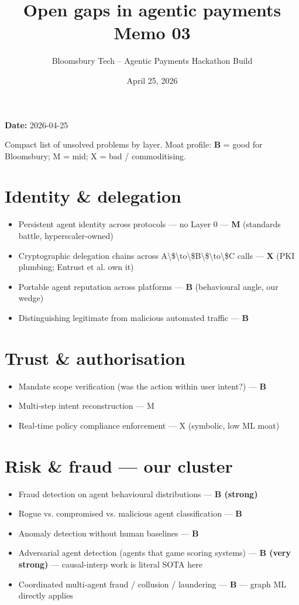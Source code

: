 \documentclass[11pt]{article}
\title{\textbf{Open gaps in agentic payments}\\
\large Memo 03}
\author{Bloomsbury Tech -- Agentic Payments Hackathon Build}
\date{April 25, 2026}
\begin{document}
\maketitle

\textbf{Date:} 2026-04-25

Compact list of unsolved problems by layer. Moat profile: \textbf{B} = good for Bloomsbury; M = mid; X = bad / commoditising.

\section{Identity \& delegation}
\begin{itemize}
  \item Persistent agent identity across protocols --- no Layer 0 --- \textbf{M} (standards battle, hyperscaler-owned)
  \item Cryptographic delegation chains across A\textbackslash{}\$\textbackslash{}to\textbackslash{}\$B\textbackslash{}\$\textbackslash{}to\textbackslash{}\$C calls --- \textbf{X} (PKI plumbing; Entrust et al. own it)
  \item Portable agent reputation across platforms --- \textbf{B} (behavioural angle, our wedge)
  \item Distinguishing legitimate from malicious automated traffic --- \textbf{B}
\end{itemize}
\section{Trust \& authorisation}
\begin{itemize}
  \item Mandate scope verification (was the action within user intent?) --- \textbf{B}
  \item Multi-step intent reconstruction --- M
  \item Real-time policy compliance enforcement --- X (symbolic, low ML moat)
\end{itemize}
\section{Risk \& fraud --- our cluster}
\begin{itemize}
  \item Fraud detection on agent behavioural distributions --- \textbf{B (strong)}
  \item Rogue vs. compromised vs. malicious agent classification --- \textbf{B}
  \item Anomaly detection without human baselines --- \textbf{B}
  \item Adversarial agent detection (agents that game scoring systems) --- \textbf{B (very strong)} --- causal-interp work is literal SOTA here
  \item Coordinated multi-agent fraud / collusion / laundering --- \textbf{B} --- graph ML directly applies
\end{itemize}
\end{document}
